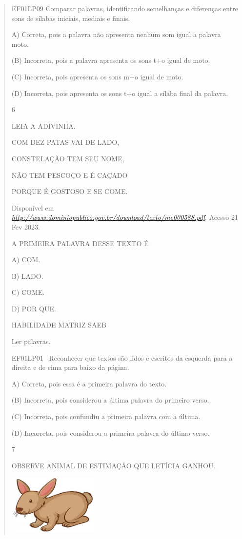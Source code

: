 \begin{escola}
{\begin{verse}
EF01LP09 Comparar palavras, identificando semelhanças e diferenças entre
sons de sílabas iniciais, mediais e finais.

A) Correta, pois a palavra não apresenta nenhum som igual a palavra
moto.

(B) Incorreta, pois a palavra apresenta os sons t+o igual de moto.

(C) Incorreta, pois apresenta os sons m+o igual de moto.

(D) Incorreta, pois apresenta os sons t+o igual a sílaba final da
palavra.

\num{6}

LEIA A ADIVINHA.

COM DEZ PATAS VAI DE LADO,

CONSTELAÇÃO TEM SEU NOME,

NÃO TEM PESCOÇO E É CAÇADO

PORQUE É GOSTOSO E SE COME.

Disponível em
\href{http://www.dominiopublico.gov.br/download/texto/me000588.pdf}{\emph{http://www.dominiopublico.gov.br/download/texto/me000588.pdf}}.
Acesso 21 Fev 2023.

A PRIMEIRA PALAVRA DESSE TEXTO É

A) COM.

B) LADO.

C) COME.

D) POR QUE.

HABILIDADE MATRIZ SAEB

Ler palavras.

EF01LP01 ~Reconhecer que textos são lidos e escritos da esquerda para a
direita e de cima para baixo da página.

A) Correta, pois essa é a primeira palavra do texto.

(B) Incorreta, pois considerou a última palavra do primeiro verso.

(C) Incorreta, pois confundiu a primeira palavra com a última.

(D) Incorreta, pois considerou a primeira palavra do último
verso.\protect\hypertarget{_heading=h.bww9mmn8u5sl}{}{}

\num{7}

OBSERVE ANIMAL DE ESTIMAÇÃO QUE LETÍCIA GANHOU.

\includegraphics[width=1.75903in,height=1.18611in]{media/image246.jpg}


\end{verse}}
\end{escola}
